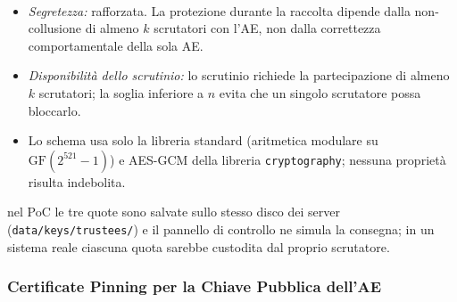 \documentclass[12pt,a4paper]{article}
\begin{document}
\begin{description}
\begin{itemize}
    \end{itemize}
  \item[Analisi dell'impatto sulle proprietà:] \
    \begin{itemize}
      \item \textit{Segretezza:} rafforzata. La protezione durante la raccolta dipende dalla non-collusione di almeno $k$ scrutatori con l'AE, non dalla correttezza comportamentale della sola AE.
      \item \textit{Disponibilità dello scrutinio:} lo scrutinio richiede la partecipazione di almeno $k$ scrutatori; la soglia inferiore a $n$ evita che un singolo scrutatore possa bloccarlo.
      \item Lo schema usa solo la libreria standard (aritmetica modulare su $\mathrm{GF}(2^{521}-1)$) e AES-GCM della libreria \texttt{cryptography}; nessuna proprietà risulta indebolita.
    \end{itemize}
  \item[Limite del prototipo:] nel PoC le tre quote sono salvate sullo stesso disco dei server (\texttt{data/keys/trustees/}) e il pannello di controllo ne simula la consegna; in un sistema reale ciascuna quota sarebbe custodita dal proprio scrutatore.
\end{description}

\subsubsection{Certificate Pinning per la Chiave Pubblica dell'AE}
\label{sec:mod34}
\end{document}
